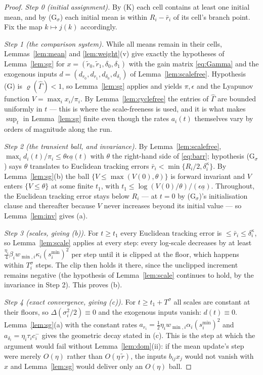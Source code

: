 \documentclass[11pt]{article}
\theoremstyle{definition}
\begin{document}
\begin{proof}
\emph{Step 0 (initial assignment).} By (K) each cell contains at least one
initial mean, and by (G$_\sigma$) each initial mean is within $R_i - \bar r_i$ of
its cell's branch point. Fix the map $k \mapsto j(k)$ accordingly.

\emph{Step 1 (the comparison system).} While all means remain in their cells,
Lemmas~\ref{lem:mean} and \ref{lem:weight}(v) give exactly the hypotheses of
Lemma~\ref{lem:sg} for $x = (\tilde r_0, \tilde r_1, \delta_0, \delta_1)$ with the
gain matrix \eqref{eq:Gamma} and the exogenous inputs
$d = (d_{r_0}, d_{r_1}, d_{\delta_0}, d_{\delta_1})$ of
Lemma~\ref{lem:scalefree}. Hypothesis (G) is $\varrho(\hat\Gamma) < 1$, so
Lemma~\ref{lem:sg} applies and yields $\pi, \epsilon$ and the Lyapunov function
$V = \max_i x_i/\pi_i$. By Lemma~\ref{lem:cyclefree} the entries of $\hat\Gamma$
are bounded uniformly in $t$ --- this is where the scale-freeness is used, and it
is what makes $\sup_t$ in Lemma~\ref{lem:sg} finite even though the rates
$a_i(t)$ themselves vary by orders of magnitude along the run.

\emph{Step 2 (the transient ball, and invariance).} By
Lemma~\ref{lem:scalefree}, $\max_i d_i(t)/\pi_i \le \theta\epsilon\underline a(t)$
with $\theta$ the right-hand side of \eqref{eq:barr}; hypothesis (G$_\sigma$) says
$\theta$ translates to Euclidean tracking errors $\bar r_i < \min\{R_i/2,
\delta^\kappa_i\}$. By Lemma~\ref{lem:sg}(b) the ball $\{V \le \max(V(0),\theta)\}$
is forward invariant and $V$ enters $\{V \le \theta\}$ at some finite $t_1$, with
$t_1 \le \log(V(0)/\theta)/(\epsilon\underline a)$. Throughout, the Euclidean
tracking error stays below $R_i$ --- at $t = 0$ by (G$_\sigma$)'s initialisation
clause and thereafter because $V$ never increases beyond its initial value --- so
Lemma~\ref{lem:inv} gives (a).

\emph{Step 3 (scales, giving (b)).} For $t \ge t_1$ every Euclidean tracking error
is $\le \bar r_i \le \delta^\kappa_i$, so Lemma~\ref{lem:scale} applies at every
step: every log-scale decreases by at least $\tfrac{\eta_i}{4}\beta_i w_{\min,i}
\kappa_i (s^{\min}_i)^2$ per step until it is clipped at the floor, which happens
within $T^\sigma_i$ steps. The clip then holds it there, since the unclipped
increment remains negative (the hypothesis of Lemma~\ref{lem:scale} continues to
hold, by the invariance in Step 2). This proves (b).

\emph{Step 4 (exact convergence, giving (c)).} For $t \ge t_1 + T^\sigma$ all
scales are constant at their floors, so $\Delta(\sigma_i^2/2) \equiv 0$ and the
exogenous inputs vanish: $d(t) \equiv 0$. Lemma~\ref{lem:sg}(a) with the constant
rates $a_{r_i} = \tfrac12 \eta_i w_{\min,i}\alpha_i (s^{\min}_i)^2$ and
$a_{\delta_i} = \eta_i\tau_i c^-_i$ gives the geometric decay stated in (c). This
is the step at which the argument would fail without Lemma~\ref{lem:dom}(ii): if
the mean update's step were merely $O(\eta)$ rather than $O(\eta\,\tilde r)$, the
inputs $b_{ij}x_j$ would not vanish with $x$ and Lemma~\ref{lem:sg} would deliver
only an $O(\eta)$ ball.


\end{proof}
\end{document}
